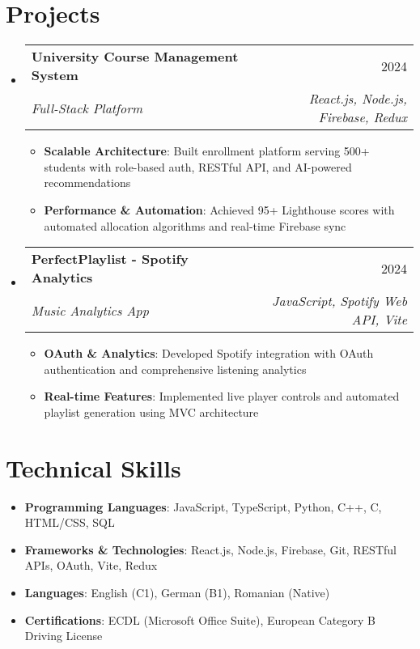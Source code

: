 \documentclass[letterpaper,11pt]{article}
\makeatletter
\newcommand{\resumeItem}[2]{
  \item\small{
    \textbf{#1}{: #2 \vspace{-3pt}}
  }
}
\newcommand{\resumeSubheading}[4]{
  \vspace{-2pt}\item
    \begin{tabular*}{0.97\textwidth}{l@{\extracolsep{\fill}}r}
      \textbf{#1} & #2 \\
      \textit{\small#3} & \textit{\small #4} \\
    \end{tabular*}\vspace{-6pt}
}
\newcommand{\resumeSubItem}[2]{\resumeItem{#1}{#2}\vspace{-4pt}}
\newcommand{\resumeSubHeadingListStart}{\begin{itemize}[leftmargin=*]}
\newcommand{\resumeSubHeadingListEnd}{\end{itemize}}
\newcommand{\resumeItemListStart}{\begin{itemize}}
\newcommand{\resumeItemListEnd}{\end{itemize}\vspace{-6pt}}
\makeatother
\begin{document}
\section{Projects}
  \resumeSubHeadingListStart
    \resumeSubheading
      {University Course Management System}{2024}
      {Full-Stack Platform}{React.js, Node.js, Firebase, Redux}
      \resumeItemListStart
        \resumeItem{Scalable Architecture}
          {Built enrollment platform serving 500+ students with role-based auth, RESTful API, and AI-powered recommendations}
        \resumeItem{Performance \& Automation}
          {Achieved 95+ Lighthouse scores with automated allocation algorithms and real-time Firebase sync}
      \resumeItemListEnd
    \resumeSubheading
      {PerfectPlaylist - Spotify Analytics}{2024}
      {Music Analytics App}{JavaScript, Spotify Web API, Vite}
      \resumeItemListStart
        \resumeItem{OAuth \& Analytics}
          {Developed Spotify integration with OAuth authentication and comprehensive listening analytics}
        \resumeItem{Real-time Features}
          {Implemented live player controls and automated playlist generation using MVC architecture}
      \resumeItemListEnd
  \resumeSubHeadingListEnd

\section{Technical Skills}
 \resumeSubHeadingListStart
   \resumeSubItem{Programming Languages}
     {JavaScript, TypeScript, Python, C++, C, HTML/CSS, SQL}
   \resumeSubItem{Frameworks \& Technologies}
     {React.js, Node.js, Firebase, Git, RESTful APIs, OAuth, Vite, Redux}
   \resumeSubItem{Languages}
     {English (C1), German (B1), Romanian (Native)}
   \resumeSubItem{Certifications}
     {ECDL (Microsoft Office Suite), European Category B Driving License}
 \resumeSubHeadingListEnd

\end{document}

